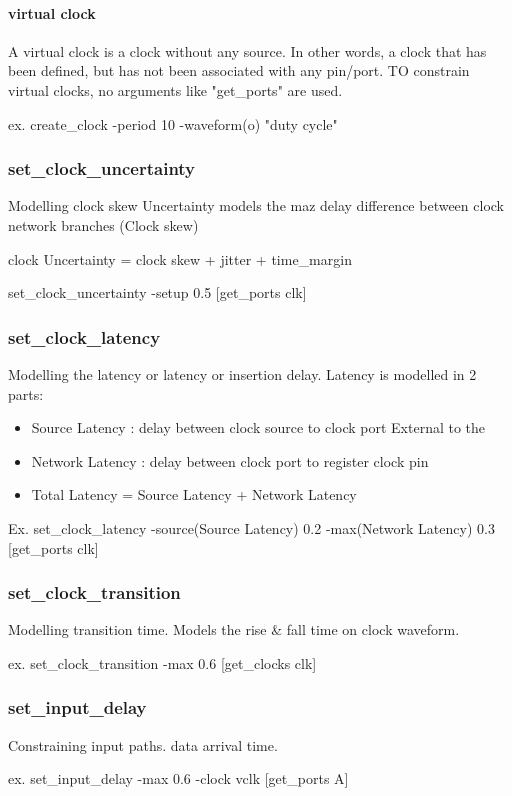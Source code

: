 \paragraph{virtual clock} A virtual clock is a clock without any source. In other words, a clock that has been defined, but has not been associated with any pin/port.
TO constrain virtual clocks, no arguments like "get\_ports" are used.\\
\centerline{ex. create\_clock -period 10 -waveform(o) "duty cycle"}

\subsubsection{set\_clock\_uncertainty}
Modelling clock skew Uncertainty models the maz delay difference between clock network branches (Clock skew)\\    
\centerline{clock Uncertainty = clock skew + jitter + time\_margin}
\centerline{set\_clock\_uncertainty -setup 0.5 [get\_ports clk]}

\subsubsection{set\_clock\_latency}
Modelling the latency or latency or insertion delay. Latency is modelled in 2 parts: 
\begin{itemize}
    \item Source Latency : delay between clock source to clock port External to the 
    \item Network Latency : delay between clock port to register clock pin
    \item Total Latency = Source Latency + Network Latency
\end{itemize}
\centerline{Ex. set\_clock\_latency -source(Source Latency) 0.2 -max(Network Latency) 0.3 [get\_ports clk]}

\subsubsection{set\_clock\_transition}
Modelling transition time. Models the rise \& fall time on clock waveform.\\
\centerline{ex. set\_clock\_transition -max 0.6 [get\_clocks clk]}

\subsubsection{set\_input\_delay}
Constraining input paths. data arrival time.\\  
\centerline{ex. set\_input\_delay -max 0.6 -clock vclk [get\_ports A]}

